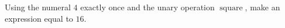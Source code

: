 Using the numeral $4$ exactly once and the unary operation $\operatorname{square}$, make an expression equal to $16$.
